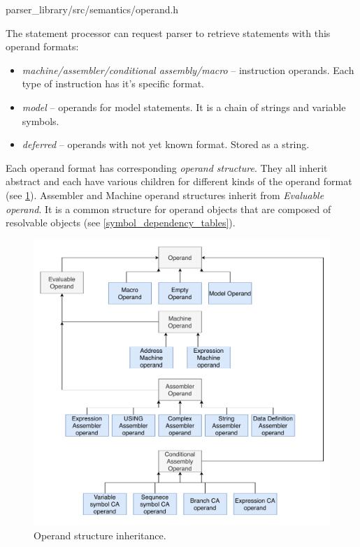 {parser\_library/src/semantics/operand.h}

The statement processor can request parser to retrieve statements with this operand formats:
\begin{itemize}
	\item \emph{machine/assembler/conditional assembly/macro} -- instruction operands. Each type of instruction has it's specific format.
	\item \emph{model} -- operands for model statements. It is a chain of strings and variable symbols.
	\item \emph{deferred} -- operands with not yet known format. Stored as a string.
\end{itemize}

Each operand format has corresponding \emph{operand structure}. They all inherit abstract  and each have various children for different kinds of the operand format (see \cref{fig06:operand_arch}). Assembler and Machine operand structures inherit from \emph{Evaluable operand}. It is a common structure for operand objects that are composed of resolvable objects (see \cref{symbol_dependency_tables}).

\begin{figure}
	\centering
	\includegraphics[width=\textwidth]{img/operand_arch}
	\caption{Operand structure inheritance.}
	\label{fig06:operand_arch}
\end{figure}

